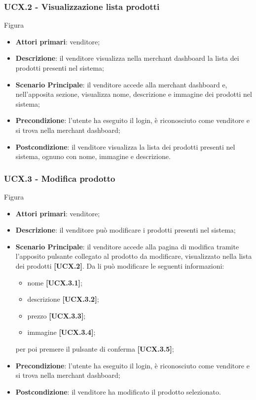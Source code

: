 \subsubsection{UCX.2 - Visualizzazione lista prodotti}
Figura \\
\begin{itemize}
\item \textbf{Attori primari}: venditore;
\item \textbf{Descrizione}: il venditore visualizza nella merchant dashboard la lista dei prodotti presenti nel sistema;
\item \textbf{Scenario Principale}: il venditore accede alla merchant dashboard e, nell'apposita sezione, visualizza nome, descrizione e immagine dei prodotti nel sistema;
\item \textbf{Precondizione}: l'utente ha eseguito il login, è riconosciuto come venditore e si trova nella merchant dashboard;
\item \textbf{Postcondizione}: il venditore visualizza la lista dei prodotti presenti nel sistema, ognuno con nome, immagine e descrizione.
\end{itemize}

\subsubsection{UCX.3 - Modifica prodotto}
Figura \\
\begin{itemize}
\item \textbf{Attori primari}: venditore;
\item \textbf{Descrizione}: il venditore può modificare i prodotti presenti nel sistema;
\item \textbf{Scenario Principale}: il venditore accede alla pagina di modifica tramite l'apposito pulsante collegato al prodotto da modificare, visualizzato nella lista dei prodotti \textbf{[UCX.2]}. Da li può modificare le seguenti informazioni:
\begin{itemize}
	\item nome \textbf{[UCX.3.1]};
	\item descrizione \textbf{[UCX.3.2]};
	\item prezzo \textbf{[UCX.3.3]};
	\item immagine \textbf{[UCX.3.4]};
\end{itemize}
per poi premere il pulsante di conferma \textbf{[UCX.3.5]};
\item \textbf{Precondizione}: l'utente ha eseguito il login, è riconosciuto come venditore e si trova nella merchant dashboard;
\item \textbf{Postcondizione}: il venditore ha modificato il prodotto selezionato.
\end{itemize}

